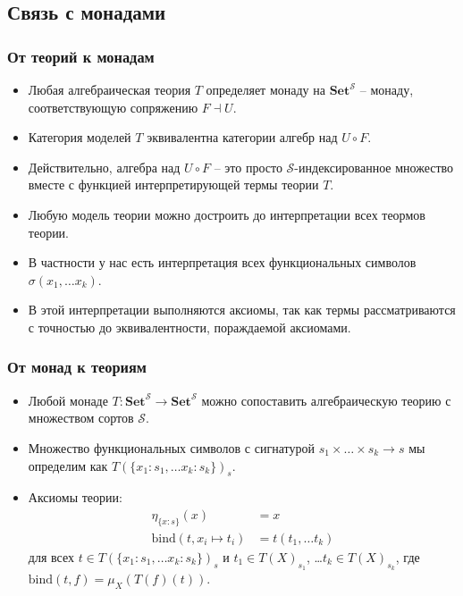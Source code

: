 \documentclass{beamer}
\theoremstyle{definition}
\newcommand{\cat}[1]{\mathbf{#1}}
\newcommand{\Set}{\cat{Set}}
\begin{document}
\subsection{Связь с монадами}

\begin{frame}
\frametitle{От теорий к монадам}
\begin{itemize}
\item Любая алгебраическая теория $T$ определяет монаду на $\Set^\mathcal{S}$ -- монаду, соответствующую сопряжению $F \dashv U$.
\item Категория моделей $T$ эквивалентна категории алгебр над $U \circ F$.
\item Действительно, алгебра над $U \circ F$ -- это просто $\mathcal{S}$-индексированное множество вместе с функцией интерпретирующей термы теории $T$.
\item Любую модель теории можно достроить до интерпретации всех теормов теории.
\item В частности у нас есть интерпретация всех функциональных символов $\sigma(x_1, \ldots x_k)$.
\item В этой интерпретации выполняются аксиомы, так как термы рассматриваются с точностью до эквивалентности, пораждаемой аксиомами.
\end{itemize}
\end{frame}

\begin{frame}
\frametitle{От монад к теориям}
\begin{itemize}
\item Любой монаде $T : \Set^\mathcal{S} \to \Set^\mathcal{S}$ можно сопоставить алгебраическую теорию с множеством сортов $\mathcal{S}$.
\item Множество функциональных символов с сигнатурой $s_1 \times \ldots \times s_k \to s$ мы определим как $T(\{ x_1 : s_1, \ldots x_k : s_k \})_s$.
\item Аксиомы теории:
\begin{align*}
\eta_{\{x : s\}}(x) & = x \\
\text{bind}(t, x_i \mapsto t_i) & = t(t_1, \ldots t_k)
\end{align*}
для всех $t \in T(\{ x_1 : s_1, \ldots x_k : s_k \})_s$ и $t_1 \in T(X)_{s_1}$, \ldots $t_k \in T(X)_{s_k}$,
где $\text{bind}(t,f) = \mu_X(T(f)(t))$.
\end{itemize}
\end{frame}
\end{document}
